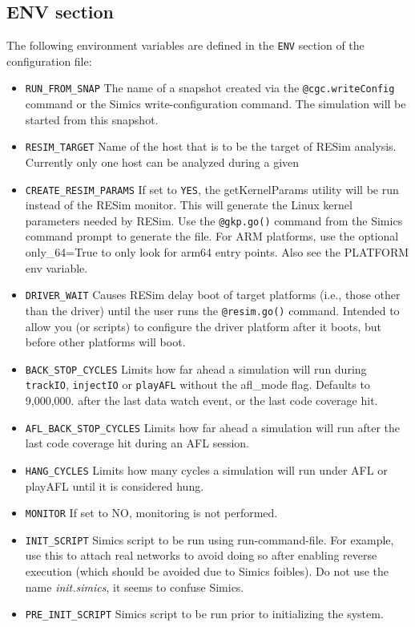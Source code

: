 \documentclass[titlepage]{article}
\begin{document}
\subsection{ENV section}
\label{env}
The following environment variables are defined in the {\tt ENV} section of the configuration file:
\begin{itemize}
\item {\tt RUN\_FROM\_SNAP} The name of a snapshot created via the {\tt @cgc.writeConfig} command or the Simics write-configuration 
command.  The simulation will be started from this snapshot.
\item {\tt RESIM\_TARGET} Name of the host that is to be the target of RESim analysis.  Currently only one host can be analyzed during a given
\item {\tt CREATE\_RESIM\_PARAMS} If set to {\tt YES}, the getKernelParams utility will be run instead of the RESim monitor.  This will
generate the Linux kernel parameters needed by RESim.  Use the {\tt @gkp.go()} command from the Simics command prompt to generate the file.
For ARM platforms, use the optional only\_64=True to only look for arm64 entry points.  Also see the PLATFORM env variable.
\item {\tt DRIVER\_WAIT} Causes RESim delay boot of target platforms (i.e., those other than the driver) until the 
user runs the {\tt @resim.go()} command.  Intended to allow you (or scripts)
to configure the driver platform after it boots, but before other platforms will boot.
\item {\tt BACK\_STOP\_CYCLES} Limits how far ahead a simulation will run during {\tt trackIO}, {\tt injectIO} or {\tt playAFL} without the
afl\_mode flag. Defaults to 9,000,000. 
after the last data watch event, or the last code coverage hit.
\item {\tt AFL\_BACK\_STOP\_CYCLES} Limits how far ahead a simulation will run after the last code coverage hit during an AFL session.
\item {\tt HANG\_CYCLES} Limits how many cycles a simulation will run under AFL or playAFL until it is considered hung.
\item {\tt MONITOR} If set to NO, monitoring is not performed.
\item{\tt INIT\_SCRIPT} Simics script to be run using run-command-file.  For example, use this to attach real networks to avoid
doing so after enabling reverse execution (which should be avoided due to Simics foibles).  Do not use the name \textit{init.simics}, it seems
to confuse Simics.
\item{\tt PRE\_INIT\_SCRIPT} Simics script to be run prior to initializing the system.

\end{itemize}
\end{document}
